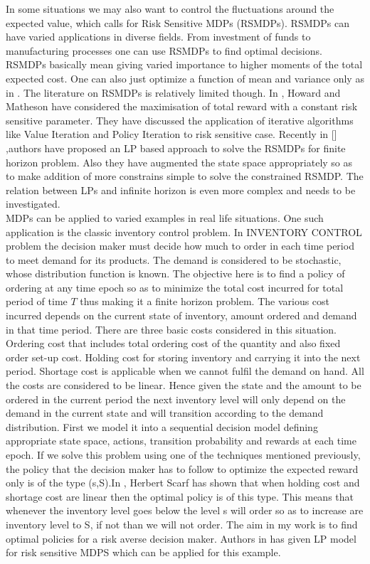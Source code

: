 \documentclass[11pt,a4paper,oneside]{report}
\begin{document}
In some situations we may also want to control the fluctuations around the expected value, which calls for Risk Sensitive MDPs (RSMDPs). RSMDPs can have varied applications in diverse fields. From investment of funds to manufacturing processes one can use RSMDPs to find optimal decisions. RSMDPs basically mean giving varied importance to higher moments of the total expected cost. One can also just optimize a function of mean and variance only as in \citep{mannor2011mean}.  The literature on RSMDPs is relatively limited though. In \cite{howard1972risk}, Howard and Matheson have considered the maximisation of total reward with a constant risk sensitive parameter. They have discussed the application of iterative algorithms like Value Iteration and Policy Iteration to risk sensitive case. Recently in [\citep{kumar2015finite}] ,authors have proposed an LP based approach to solve the RSMDPs for finite horizon problem. Also they have augmented the state space appropriately so as to make addition of more constrains simple to solve the constrained RSMDP. The relation between LPs and infinite horizon is even more complex and needs to be investigated.\\ 


\noindent MDPs can be applied to varied examples in real life situations. One such application is the classic inventory control problem. In INVENTORY CONTROL problem the decision maker must decide how much to order in each time period to meet demand for its products. The demand  is considered to be stochastic, whose distribution function is known. The objective here is to find a policy of ordering at any time epoch so as to minimize the total cost incurred for total period of time $T$ thus making it a finite horizon problem. The various cost incurred depends on the current state of inventory, amount ordered and demand in that time period. There are three basic costs considered in this situation. Ordering cost that includes total  ordering cost of the quantity and also fixed order set-up cost. Holding cost for storing inventory and carrying it into the next period. Shortage cost is applicable when we cannot fulfil the demand on hand. All the costs are considered to be linear. Hence given the state and the amount to be ordered in the current period the next inventory level will only depend on the demand in the current state and will transition according to the demand distribution.  First we model it into a sequential decision model defining appropriate state space, actions, transition probability and rewards at each time epoch.  If we solve this problem using one of the techniques mentioned previously, the policy that the decision maker has to follow to optimize the expected reward only  is of the type (s,S).In \cite{scarf1959optimality}, Herbert Scarf has shown that when holding cost and shortage cost are linear then the optimal policy is of this type. This means that whenever the inventory level goes below the level s will order so as to increase are inventory level to S, if not than we will not order.  The aim in my work is to find optimal policies for a risk averse decision maker. Authors in \citep{kumar2015finite} has given LP model for risk sensitive MDPS which can be applied for this example. \\
\end{document}

